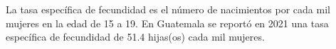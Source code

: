 La tasa específica de fecundidad es el número de nacimientos por cada mil mujeres en la edad de 15 a 19. En Guatemala se reportó en 2021 una tasa específica de fecundidad de 51.4 hijas(os) cada mil mujeres.